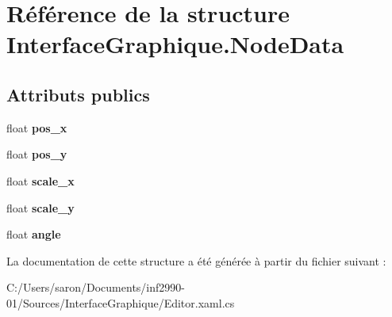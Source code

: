 \hypertarget{struct_interface_graphique_1_1_node_data}{\section{Référence de la structure Interface\-Graphique.\-Node\-Data}
\label{struct_interface_graphique_1_1_node_data}
}
\subsection*{Attributs publics}
\begin{DoxyCompactItemize}
\item 
\hypertarget{struct_interface_graphique_1_1_node_data_aa65b000f8aca6ca4ef06867dece673bc}{float {\bfseries pos\-\_\-x}}\label{struct_interface_graphique_1_1_node_data_aa65b000f8aca6ca4ef06867dece673bc}

\item 
\hypertarget{struct_interface_graphique_1_1_node_data_a9f8a6932e2af21e5c9de9ca0da1b10d5}{float {\bfseries pos\-\_\-y}}\label{struct_interface_graphique_1_1_node_data_a9f8a6932e2af21e5c9de9ca0da1b10d5}

\item 
\hypertarget{struct_interface_graphique_1_1_node_data_af70290d20df57f31d3836eb0d43849f8}{float {\bfseries scale\-\_\-x}}\label{struct_interface_graphique_1_1_node_data_af70290d20df57f31d3836eb0d43849f8}

\item 
\hypertarget{struct_interface_graphique_1_1_node_data_a40c67aeb78481a26523814f70e839ddd}{float {\bfseries scale\-\_\-y}}\label{struct_interface_graphique_1_1_node_data_a40c67aeb78481a26523814f70e839ddd}

\item 
\hypertarget{struct_interface_graphique_1_1_node_data_a667c8cab7e202742610cb8ce22ad1e45}{float {\bfseries angle}}\label{struct_interface_graphique_1_1_node_data_a667c8cab7e202742610cb8ce22ad1e45}

\end{DoxyCompactItemize}


La documentation de cette structure a été générée à partir du fichier suivant \-:\begin{DoxyCompactItemize}
\item 
C\-:/\-Users/saron/\-Documents/inf2990-\/01/\-Sources/\-Interface\-Graphique/Editor.\-xaml.\-cs\end{DoxyCompactItemize}
